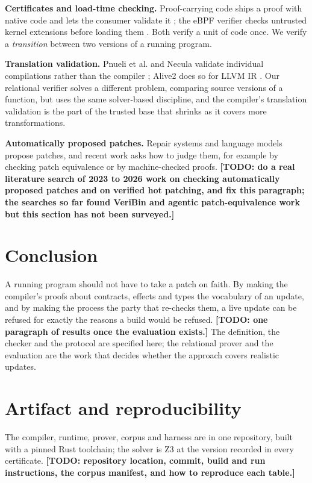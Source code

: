 \documentclass[10pt,twocolumn]{article}
\newcommand{\todo}[1]{{\color{red}\textbf{[TODO: #1]}}}
\begin{document}
\textbf{Certificates and load-time checking.} Proof-carrying code ships a proof with native code and lets the consumer validate it \cite{necula1996pcc}; the eBPF verifier checks untrusted kernel extensions before loading them \cite{gershuni2019ebpf}. Both verify a unit of code once. We verify a \emph{transition} between two versions of a running program.

\textbf{Translation validation.} Pnueli et al. and Necula validate individual compilations rather than the compiler \cite{pnueli1998tv,necula2000tv}; Alive2 does so for LLVM IR \cite{lopes2021alive2}. Our relational verifier solves a different problem, comparing source versions of a function, but uses the same solver-based discipline, and the compiler's translation validation is the part of the trusted base that shrinks as it covers more transformations.

\textbf{Automatically proposed patches.} Repair systems and language models propose patches, and recent work asks how to judge them, for example by checking patch equivalence or by machine-checked proofs. \todo{do a real literature search of 2023 to 2026 work on checking automatically proposed patches and on verified hot patching, and fix this paragraph; the searches so far found VeriBin and agentic patch-equivalence work but this section has not been surveyed.}

\section{Conclusion}\label{sec-conc}
A running program should not have to take a patch on faith. By making the compiler's proofs about contracts, effects and types the vocabulary of an update, and by making the process the party that re-checks them, a live update can be refused for exactly the reasons a build would be refused. \todo{one paragraph of results once the evaluation exists.} The definition, the checker and the protocol are specified here; the relational prover and the evaluation are the work that decides whether the approach covers realistic updates.

\section{Artifact and reproducibility}\label{sec-artifact}
The compiler, runtime, prover, corpus and harness are in one repository, built with a pinned Rust toolchain; the solver is Z3 at the version recorded in every certificate. \todo{repository location, commit, build and run instructions, the corpus manifest, and how to reproduce each table.}



\end{document}
